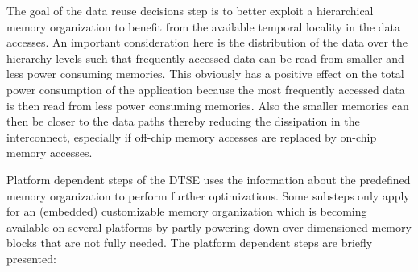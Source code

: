\begin{enumerate}
The goal of the data reuse decisions step is to better exploit a hierarchical memory organization to benefit from the available temporal locality in the data accesses. 
An important consideration here is the distribution of the data over the hierarchy levels such that frequently accessed data can be read from smaller and less power consuming memories. 
This obviously has a positive effect on the total power consumption of the application because the most frequently accessed data is then read from less power consuming memories. 
Also the smaller memories can then be closer to the data paths thereby reducing the dissipation in the interconnect, especially if off-chip memory accesses are replaced by on-chip memory accesses.
 
\end{enumerate}

Platform dependent steps of the DTSE uses the information about the predefined memory organization to perform further optimizations. 
Some substeps only apply for an (embedded) customizable memory organization which is becoming available on several platforms by partly powering down over-dimensioned memory blocks that are not fully needed. The platform dependent steps are briefly presented:

